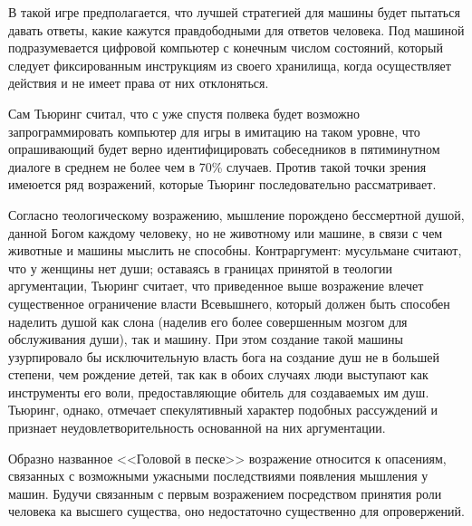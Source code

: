 \documentclass[12pt, specialist, subf, substylefile = spbu.rtx]{disser}
\begin{document}
В такой игре предполагается, что лучшей стратегией для машины будет пытаться давать ответы, какие кажутся правдободными для ответов человека. Под машиной подразумевается цифровой компьютер с конечным числом состояний, который следует фиксированным инструкциям из своего хранилища, когда осуществляет действия и не имеет права от них отклоняться. 


Сам Тьюринг считал, что с уже спустя полвека будет возможно запрограммировать компьютер для игры в имитацию на таком уровне, что опрашивающий будет верно идентифицировать собеседников в пятиминутном диалоге в среднем не более чем в 70\% случаев. Против такой точки зрения имеюется ряд возражений, которые Тьюринг последовательно рассматривает.

Согласно теологическому возражению, мышление порождено бессмертной душой, данной Богом каждому человеку, но не животному или машине, в связи с чем животные и машины мыслить не способны. Контраргумент: мусульмане считают, что у женщины нет души; оставаясь в границах принятой в теологии аргументации, Тьюринг считает, что приведенное выше возражение влечет существенное ограничение власти Всевышнего, который должен быть способен наделить душой как слона (наделив его более совершенным мозгом для обслуживания души), так и машину. При этом создание такой машины узурпировало бы исключительную власть бога на создание душ не в большей степени, чем рождение детей, так как в обоих случаях люди выступают как инструменты его воли, предоставляющие обитель для создаваемых им душ. Тьюринг, однако, отмечает спекулятивный характер подобных рассуждений и признает неудовлетворительность основанной на них аргументации.

Образно названное <<Головой в песке>> возражение относится к опасениям, связанных с возможными ужасными последствиями появления мышления у машин. Будучи связанным с первым возражением посредством принятия роли человека ка высшего существа, оно недостаточно существенно для опровержений.
\end{document}
